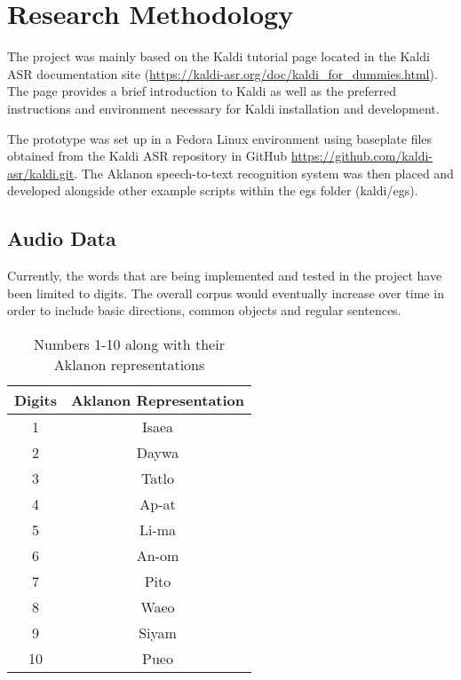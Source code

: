 
\chapter{Research Methodology}

The project was mainly based on the Kaldi tutorial page located in the Kaldi ASR documentation site (\url{https://kaldi-asr.org/doc/kaldi_for_dummies.html}). The page provides a brief introduction to Kaldi as well as the preferred instructions and environment necessary for Kaldi installation and development.

The prototype was set up in a Fedora Linux environment using baseplate files obtained from the Kaldi ASR repository in GitHub \url{https://github.com/kaldi-asr/kaldi.git}. The Aklanon speech-to-text recognition system was then placed and developed alongside other example scripts within the egs folder (kaldi/egs).

\section{Audio Data}

Currently, the words that are being implemented and tested in the project have been limited to digits. The overall corpus would eventually increase over time in order to include basic directions, common objects and regular sentences.

\begin{table}
\begin{center}
\begin{tabular}{|c|c|}
\hline
Digits & Aklanon Representation\\
\hline
1 & Isaea\\
\hline
2 & Daywa\\
\hline
3 & Tatlo\\
\hline
4 & Ap-at\\
\hline
5 & Li-ma\\
\hline
6 & An-om\\
\hline
7 & Pito\\
\hline
8 & Waeo\\
\hline
9 & Siyam\\
\hline
10 & Pueo\\
\hline

\end{tabular}{}
\end{center}
\caption{Numbers 1-10 along with their Aklanon representations}
\end{table}


